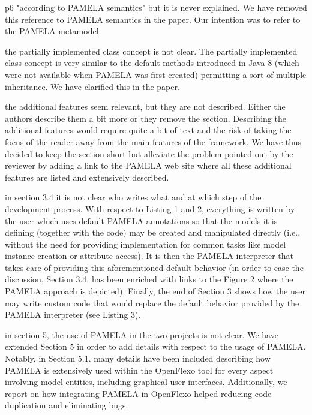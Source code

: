 \documentclass[10pt]{article}
\begin{document}
\begin{response}{p6 "according to PAMELA semantics" but it is never explained.}
We have removed this reference to PAMELA semantics in the paper. Our intention was to refer to the PAMELA metamodel.
\end{response}

\begin{response}{the partially implemented class concept is not clear.}
The partially implemented class concept is very similar to the default methods introduced in Java 8 (which were not available when PAMELA was first created) permitting a sort of multiple inheritance. We have clarified this in the paper.
\end{response}

\begin{response}{the additional features seem relevant, but they are not described. Either the authors describe them a bit more or they remove the section.}
Describing the additional features would require quite a bit of text and the risk of taking the focus of the reader away from the main features of the framework. We have thus decided to keep the section short but alleviate the problem pointed out by the reviewer by adding a link to the PAMELA web site where all these additional features are listed and extensively described.
\end{response}


\begin{response}{in section 3.4 it is not clear who writes what and at which step of the development process.}
With respect to Listing 1 and 2, everything is written by the user which uses default PAMELA annotations so that the models it is defining (together with the code) may be created and manipulated directly (i.e., without the need for providing implementation for common tasks like model instance creation or attribute access). It is then the PAMELA interpreter that takes care of providing this aforementioned default behavior (in order to ease the discussion, Section 3.4. has been enriched with links to the Figure 2 where the PAMELA approach is depicted). Finally, the end of Section 3 shows how the user may write custom code that would replace the default behavior provided by the PAMELA interpreter (see Listing 3).
\end{response}

\begin{response}{in section 5, the use of PAMELA in the two projects is not clear.}
We have extended Section 5 in order to add details with respect to the usage of PAMELA. Notably, in Section 5.1. many details have been included describing how PAMELA is extensively used within the OpenFlexo tool for every aspect involving model entities, including graphical user interfaces. Additionally, we report on how integrating PAMELA in OpenFlexo helped reducing code duplication and eliminating bugs.
\end{response}
\end{document}
